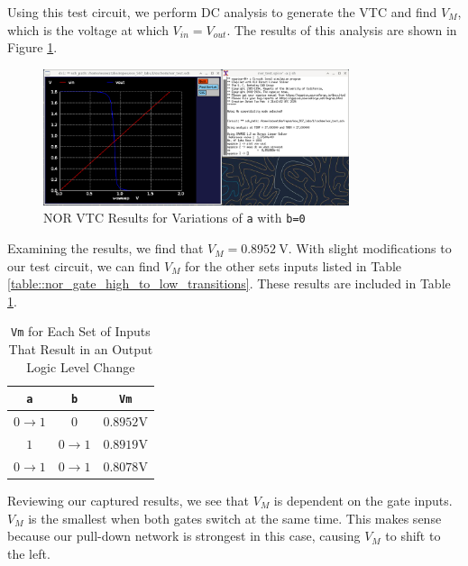 \documentclass[fleqn]{article}
\begin{document}
	\noindent Using this test circuit, we perform DC analysis to generate the VTC and find $V_M$, which is the voltage at which $V_{in} = V_{out}$. The results of this analysis are shown in Figure \ref{fig::nor_vtc_sweep_va}.
	
	\begin{figure}[H]
		\centerline{\includegraphics[width=0.8\textwidth]{nor_vtc_sweep_va.png}}
		\caption{NOR VTC Results for Variations of \texttt{a} with \texttt{b=0}}
		\label{fig::nor_vtc_sweep_va}
	\end{figure}
	
	Examining the results, we find that $V_M = 0.8952\ \text{V}$. With slight modifications to our test circuit, we can find $V_M$ for the other sets inputs listed in Table \ref{table::nor_gate_high_to_low_transitions}. These results are included in Table \ref{table::nor_gate_vm}.
	
	\begin{table}[H]
	\begin{center}
	\caption{\texttt{Vm} for Each Set of Inputs That Result in an Output Logic Level Change}
	\label{table::nor_gate_vm}
	\begin{tabular}{| c | c | c |}
		\hline
		\texttt{a} & \texttt{b} & \texttt{Vm}\\
		\hline	
		$0 \rightarrow 1$ & $0$ & $0.8952 \text{V}$\\
		\hline	
		$1$ & $0 \rightarrow 1$ & $0.8919 \text{V}$\\
		\hline	
		$0 \rightarrow 1$ & $0 \rightarrow 1$ & $0.8078 \text{V}$\\
		\hline
	\end{tabular}
	\end{center}
	\end{table}
	
	Reviewing our captured results, we see that $V_M$ is dependent on the gate inputs. $V_M$ is the smallest when both gates switch at the same time. This makes sense because our pull-down network is strongest in this case, causing $V_M$ to shift to the left.
	
\end{document}
